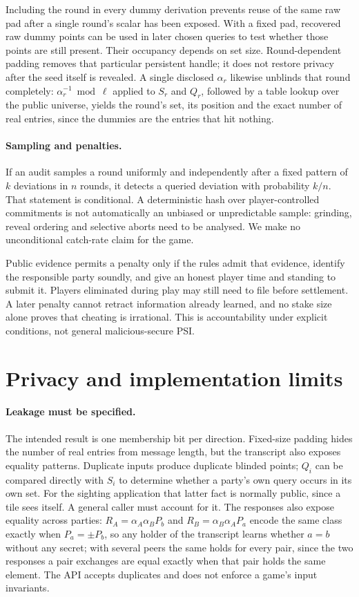 \documentclass[11pt]{article}
\begin{document}
Including the round in every dummy derivation prevents reuse of the same raw
pad after a single round's scalar has been exposed. With a fixed pad, recovered
raw dummy points can be used in later chosen queries to test whether those
points are still present. Their occupancy depends on set size. Round-dependent
padding removes that particular persistent handle; it does not restore
privacy after the seed itself is revealed. A single disclosed $\alpha_r$
likewise unblinds that round completely: $\alpha_r^{-1}\bmod\ell$ applied
to $S_r$ and $Q_r$, followed by a table lookup over the public universe,
yields the round's set, its position and the exact number of real entries,
since the dummies are the entries that hit nothing.

\paragraph{Sampling and penalties.}
If an audit samples a round uniformly and independently after a fixed pattern
of $k$ deviations in $n$ rounds, it detects a queried deviation with
probability $k/n$. That statement is conditional. A deterministic hash over
player-controlled commitments is not automatically an unbiased or
unpredictable sample: grinding, reveal ordering and selective aborts need to be
analysed. We make no unconditional catch-rate claim for the game.

Public evidence permits a penalty only if the rules admit that evidence,
identify the responsible party soundly, and give an honest player time and
standing to submit it. Players eliminated during play may still need to file
before settlement. A later penalty cannot retract information already learned,
and no stake size alone proves that cheating is irrational. This is
accountability under explicit conditions, not general malicious-secure PSI.

\section{Privacy and implementation limits}
\label{sec:limits}

\paragraph{Leakage must be specified.}
The intended result is one membership bit per direction. Fixed-size padding
hides the number of real entries from message length, but the transcript also
exposes equality patterns. Duplicate inputs produce duplicate blinded points;
$Q_i$ can be compared directly with $S_i$ to determine whether a party's own
query occurs in its own set. For the sighting application that latter fact is
normally public, since a tile sees itself. A general caller must account for
it. The responses also expose equality across parties:
$R_A=\alpha_A\alpha_B P_b$ and $R_B=\alpha_B\alpha_A P_a$ encode the same
class exactly when $P_a=\pm P_b$, so any holder of the transcript learns
whether $a=b$ without any secret; with several peers the same holds for
every pair, since the two responses a pair exchanges are equal exactly when
that pair holds the same element. The API accepts duplicates and does not enforce a game's input
invariants.
\end{document}
